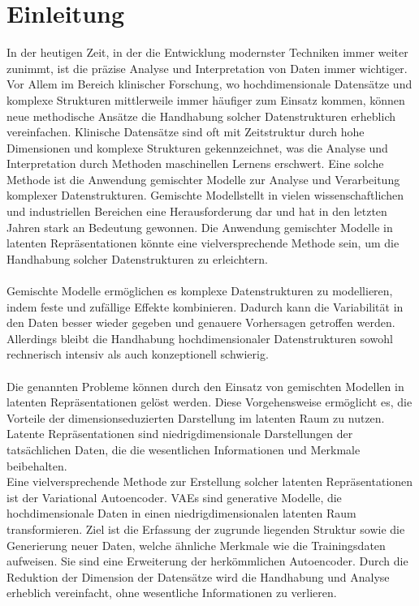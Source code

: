 \documentclass[%
thesis=student,%
coverpage=false,%
titlepage=false,%
headmarks=true, %
german,%
font=libertine, %
math=newpxtx, %
BCOR=5mm,%
coverBCOR=11mm%
]{tumbook}
\theoremstyle{break}
\begin{document}
\chapter{Einleitung}
In der heutigen Zeit, in der die Entwicklung modernster Techniken immer weiter zunimmt, ist die präzise Analyse und Interpretation von Daten immer wichtiger. Vor Allem im Bereich klinischer Forschung, wo hochdimensionale Datensätze und komplexe Strukturen mittlerweile immer häufiger zum Einsatz kommen, können neue methodische Ansätze die Handhabung solcher Datenstrukturen erheblich vereinfachen. Klinische Datensätze sind oft mit Zeitstruktur durch hohe Dimensionen und komplexe Strukturen gekennzeichnet, was die Analyse und Interpretation durch Methoden maschinellen Lernens erschwert. Eine solche Methode ist die Anwendung gemischter Modelle zur Analyse und Verarbeitung komplexer Datenstrukturen. Gemischte Modellstellt in vielen wissenschaftlichen und industriellen Bereichen eine Herausforderung dar und hat in den letzten Jahren stark an Bedeutung gewonnen. Die Anwendung gemischter Modelle in latenten Repräsentationen könnte eine vielversprechende Methode sein, um die Handhabung solcher Datenstrukturen zu erleichtern.\\
\\
Gemischte Modelle ermöglichen 
es komplexe Datenstrukturen zu modellieren, indem feste und zufällige Effekte kombinieren. Dadurch  kann die Variabilität in den Daten besser wieder gegeben und genauere Vorhersagen getroffen werden. Allerdings bleibt die Handhabung hochdimensionaler Datenstrukturen sowohl rechnerisch intensiv als auch konzeptionell schwierig.\\
\\
Die genannten Probleme können durch den Einsatz von gemischten Modellen in latenten Repräsentationen gelöst werden. Diese Vorgehensweise ermöglicht es, die Vorteile der dimensionseduzierten Darstellung im latenten Raum zu nutzen. Latente Repräsentationen sind niedrigdimensionale Darstellungen der tatsächlichen Daten, die die wesentlichen Informationen und Merkmale beibehalten. \\
Eine vielversprechende Methode zur Erstellung solcher latenten Repräsentationen ist der Variational Autoencoder. VAEs sind generative Modelle, die hochdimensionale Daten in einen niedrigdimensionalen latenten Raum transformieren. Ziel ist die Erfassung der zugrunde liegenden Struktur sowie die Generierung neuer Daten, welche ähnliche Merkmale wie die Trainingsdaten aufweisen. Sie sind eine Erweiterung der herkömmlichen Autoencoder. Durch die Reduktion der Dimension der Datensätze wird die Handhabung und Analyse erheblich vereinfacht, ohne wesentliche Informationen zu verlieren. \\
\end{document}
